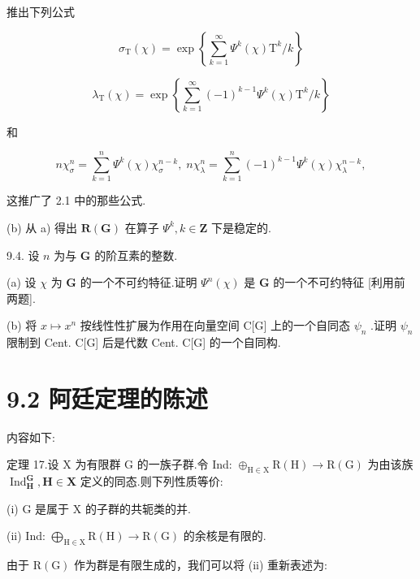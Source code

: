 \documentclass[10pt]{article}
\begin{document}
推出下列公式

\[
{\sigma }_{\mathrm{T}}\left( \chi \right)  = \exp \left\{  {\mathop{\sum }\limits_{{k = 1}}^{\infty }{\Psi }^{k}\left( \chi \right) {\mathrm{T}}^{k}/k}\right\}
\]

\[
{\lambda }_{\mathrm{T}}\left( \chi \right)  = \exp \left\{  {\mathop{\sum }\limits_{{k = 1}}^{\infty }{\left( -1\right) }^{k - 1}{\Psi }^{k}\left( \chi \right) {\mathrm{T}}^{k}/k}\right\}
\]

和

\[
n{\chi }_{\sigma }^{n} = \mathop{\sum }\limits_{{k = 1}}^{n}{\Psi }^{k}\left( \chi \right) {\chi }_{\sigma }^{n - k},\;n{\chi }_{\lambda }^{n} = \mathop{\sum }\limits_{{k = 1}}^{n}{\left( -1\right) }^{k - 1}{\Psi }^{k}\left( \chi \right) {\chi }_{\lambda }^{n - k},
\]

这推广了 2.1 中的那些公式.

(b) 从 a) 得出 \(\mathbf{R}\left( \mathbf{G}\right)\) 在算子 \({\Psi }^{k},k \in  \mathbf{Z}\) 下是稳定的.

9.4. 设 \(n\) 为与 \(\mathbf{G}\) 的阶互素的整数.

(a) 设 \(\chi\) 为 \(\mathbf{G}\) 的一个不可约特征.证明 \({\Psi }^{n}\left( \chi \right)\) 是 \(\mathbf{G}\) 的一个不可约特征 [利用前两题].

(b) 将 \(x \mapsto  {x}^{n}\) 按线性性扩展为作用在向量空间 C[G] 上的一个自同态 \({\psi }_{n}\) .证明 \({\psi }_{n}\) 限制到 Cent. C[G] 后是代数 Cent. C[G] 的一个自同构.

\section*{9.2 阿廷定理的陈述}

内容如下:

定理 17.设 \(\mathrm{X}\) 为有限群 G 的一族子群.令 Ind: \({ \oplus  }_{\mathrm{H} \in  \mathrm{X}}\mathrm{R}\left( \mathrm{H}\right)  \rightarrow  \mathrm{R}\left( \mathrm{G}\right)\) 为由该族 \({\operatorname{Ind}}_{\mathbf{H}}^{\mathbf{G}},\mathbf{H} \in  \mathbf{X}\) 定义的同态.则下列性质等价:

(i) \(\mathrm{G}\) 是属于 \(\mathrm{X}\) 的子群的共轭类的并.

(ii) Ind: \({\bigoplus }_{\mathrm{H} \in  \mathrm{X}}\mathrm{R}\left( \mathrm{H}\right)  \rightarrow  \mathrm{R}\left( \mathrm{G}\right)\) 的余核是有限的.

由于 \(\mathrm{R}\left( \mathrm{G}\right)\) 作为群是有限生成的，我们可以将 (ii) 重新表述为:
\end{document}

